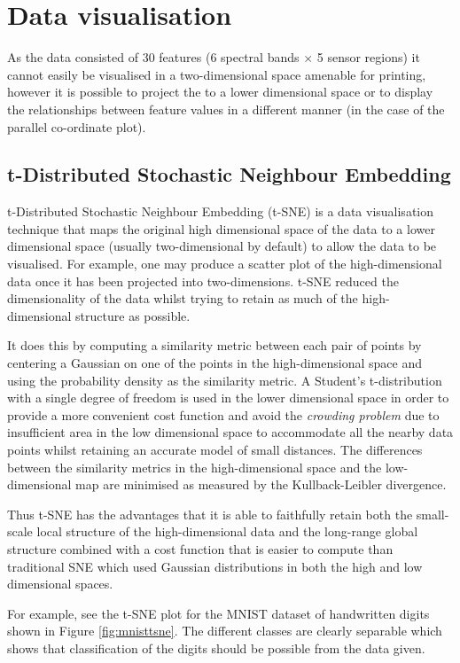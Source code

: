 \section{Data visualisation}

As the data consisted of 30 features (6 spectral bands $\times$ 5 sensor regions) it cannot easily be visualised in a two-dimensional space amenable for printing, however it is possible to project the to a lower dimensional space or to display the relationships between feature values in a different manner (in the case of the parallel co-ordinate plot).


\subsection{t-Distributed Stochastic Neighbour Embedding}

t-Distributed Stochastic Neighbour Embedding (t-SNE)\cite{Maaten2008} is a data visualisation technique that maps the original high dimensional space of the data to a lower dimensional space (usually two-dimensional by default) to allow the data to be visualised. For example, one may produce a scatter plot of the high-dimensional data once it has been projected into two-dimensions. t-SNE reduced the dimensionality of the data whilst trying to retain as much of the high-dimensional structure as possible.

 It does this by computing a similarity metric between each pair of points by centering a Gaussian on one of the points in the high-dimensional space and using the probability density as the similarity metric. A Student's t-distribution with a single degree of freedom is used in the lower dimensional space in order to provide a more convenient cost function and avoid the \textit{crowding problem} due to insufficient area in the low dimensional space to accommodate all the nearby data points whilst retaining an accurate model of small distances. The differences between the similarity metrics in the high-dimensional space and the low-dimensional map are minimised as measured by the Kullback-Leibler divergence.\cite{Maaten2008}

 Thus t-SNE has the advantages that it is able to faithfully retain both the small-scale local structure of the high-dimensional data and the long-range global structure combined with a cost function that is easier to compute than traditional SNE which used Gaussian distributions in both the high and low dimensional spaces.\cite{Maaten2008}

 For example, see the t-SNE plot for the MNIST dataset of handwritten digits shown in Figure \ref{fig:mnisttsne}. The different classes are clearly separable which shows that classification of the digits should be possible from the data given.


